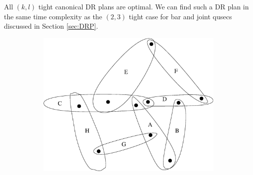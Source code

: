 \begin{remark}
    All $(k,l)$ tight canonical DR plans are optimal. We can find such a DR plan in the same time complexity as the $(2,3)$ tight case for bar and joint qusecs discussed in Section \ref{sec:DRP}.
\end{remark}
\begin{figure}\centering
\begin{subfigure}{0.2\linewidth}\centering
    \includegraphics[width=\linewidth]{img/bodypin}
    \caption{}
\end{subfigure}
\begin{subfigure}{0.2\linewidth}\centering
\end{subfigure}
\end{figure}
